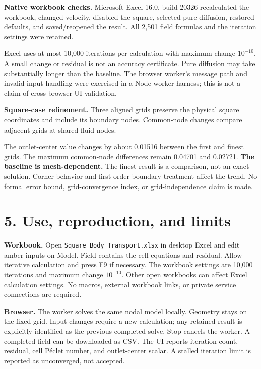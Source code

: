 \documentclass[11pt,letterpaper]{article}
\begin{document}
\textbf{Native workbook checks.} Microsoft Excel 16.0, build 20326 recalculated the workbook, changed velocity, disabled the square, selected pure diffusion, restored defaults, and saved/reopened the result. All 2,501 field formulas and the iteration settings were retained.
\begin{center}\small\end{center}
Excel uses at most 10,000 iterations per calculation with maximum change $10^{-10}$. A small change or residual is not an accuracy certificate. Pure diffusion may take substantially longer than the baseline. The browser worker's message path and invalid-input handling were exercised in a Node worker harness; this is not a claim of cross-browser UI validation.

\textbf{Square-case refinement.} Three aligned grids preserve the physical square coordinates and include its boundary nodes. Common-node changes compare adjacent grids at shared fluid nodes.
\begin{center}\small\end{center}
The outlet-center value changes by about 0.01516 between the first and finest grids. The maximum common-node differences remain 0.04701 and 0.02721. \textbf{The baseline is mesh-dependent.} The finest result is a comparison, not an exact solution. Corner behavior and first-order boundary treatment affect the trend. No formal error bound, grid-convergence index, or grid-independence claim is made.

\newpage
\section*{5. Use, reproduction, and limits}
\textbf{Workbook.} Open \texttt{Square\_Body\_Transport.xlsx} in desktop Excel and edit amber inputs on Model. Field contains the cell equations and residual. Allow iterative calculation and press F9 if necessary. The workbook settings are 10,000 iterations and maximum change $10^{-10}$. Other open workbooks can affect Excel calculation settings. No macros, external workbook links, or private service connections are required.

\textbf{Browser.} The worker solves the same nodal model locally. Geometry stays on the fixed grid. Input changes require a new calculation; any retained result is explicitly identified as the previous completed solve. Stop cancels the worker. A completed field can be downloaded as CSV. The UI reports iteration count, residual, cell P\'eclet number, and outlet-center scalar. A stalled iteration limit is reported as unconverged, not accepted.
\end{document}
